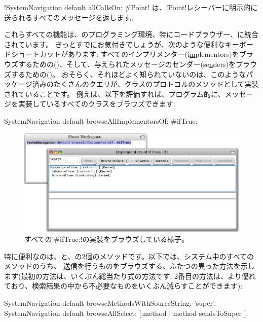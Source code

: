 \documentclass[a4paper,10pt,twoside]{book}
\begin{document}
\ct!SystemNavigation default allCallsOn: #Point! は、\ct!Point!レシーバーに明示的に送られるすべてのメッセージを返します。

これらすべての機能は、\pharo のプログラミング環境、特にコードブラウザー、に統合されています。
きっとすでにお気付きでしょうが、次のような便利なキーボードショートカットがあります: すべてのインプリメンター(i\underline{m}plementors)をブラウズするための()、そして、与えられたメッセージのセンダー(se\underline{n}ders)をブラウズするための()。
おそらく、それほどよく知られていないのは、このようなパッケージ済みのたくさんのクエリが、クラスのプロトコルのメソッドとして実装されていることです。
例えば、以下を評価すれば、プログラム的に、メッセージを実装しているすべてのクラスをブラウズできます:
\begin{code}{}
SystemNavigation default browseAllImplementorsOf: #ifTrue:
\end{code}

\begin{figure}[ht]\centering
	\includegraphics[width=\linewidth]{implementors}
	\caption{すべての\ct!\#ifTrue:!の実装をブラウズしている様子。}
\end{figure}

特に便利なのは、と、の2個のメソッドです。以下では、システム中のすべてのメソッドのうち、\super-送信を行うものをブラウズする、ふたつの異った方法を示します(最初の方法は、いくぶん総当たり式の方法です; 2番目の方法は、より優れており、検索結果の中から不必要なものをいくぶん減らすことができます):
\begin{code}{}
SystemNavigation default browseMethodsWithSourceString: 'super'.
SystemNavigation default browseAllSelect: [:method | method sendsToSuper ].
\end{code}
\end{document}
